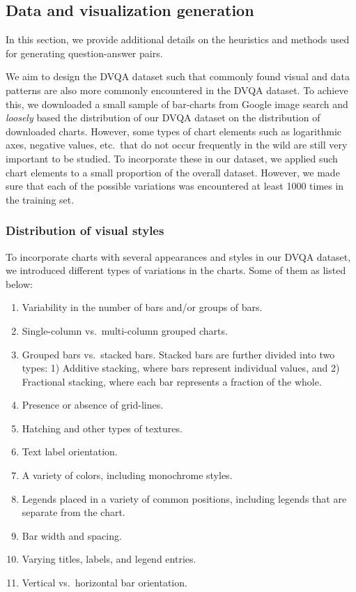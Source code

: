 \documentclass[10pt,twocolumn,letterpaper]{article}
\begin{document}
\begin{appendices}
\subsection{Data and visualization generation}

In this section, we provide additional details on the heuristics and methods used for generating question-answer pairs.%

We aim to design the DVQA dataset such that commonly found visual and data patterns are also more commonly encountered in the DVQA dataset. To achieve this, we downloaded a small sample of bar-charts from Google image search and \textit{loosely} based the distribution of our DVQA dataset on the distribution of downloaded charts. However, some types of chart elements such as logarithmic axes, negative values, etc.\ that do not occur frequently in the wild are still very important to be studied. To incorporate these in our dataset, we applied such chart elements to a small proportion of the overall dataset. However, we made sure that each of the possible variations was encountered at least 1000 times in the training set.

\subsubsection{Distribution of visual styles} 
To incorporate charts with several appearances and styles in our DVQA dataset, we introduced different types of variations in the charts. Some of them as listed below:

\begin{enumerate}
\item Variability in the number of bars and/or groups of bars.
\item Single-column vs.\ multi-column grouped charts.
\item Grouped bars vs.\ stacked bars. Stacked bars are further divided into two types: 1) Additive stacking,  where bars represent individual values, and 2) Fractional stacking, where each bar represents a fraction of the whole.
\item Presence or absence of grid-lines.
\item Hatching and other types of textures.
\item Text label orientation.
\item A variety of colors, including monochrome styles.
\item Legends placed in a variety of common positions, including legends that are separate from the chart.
\item Bar width and spacing.
\item Varying titles, labels, and legend entries.
\item Vertical vs.\ horizontal bar orientation.
\end{enumerate}


\end{appendices}
\end{document}
